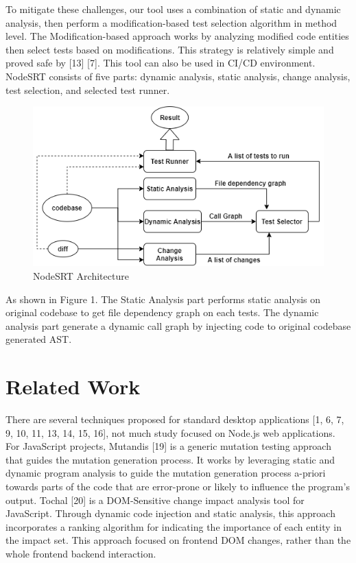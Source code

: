 \documentclass[10pt, conference]{IEEEtran}
\begin{document}
To mitigate these challenges, our tool uses a combination of static and dynamic analysis, then perform a modification-based test 
selection algorithm in method level. The Modification-based approach works by analyzing modified code entities 
then select tests based on modifications. This strategy is relatively simple and proved safe by [13] [7]. This tool can 
also be used in CI/CD environment. NodeSRT consists of five parts: dynamic analysis, static analysis, change analysis, 
test selection, and selected test runner. 
\begin{figure}[htbp]
    \centerline{\includegraphics[scale=0.45]{NodeSRT Architecture.png}}
    \caption{NodeSRT Architecture}
    \label{fig}
    \end{figure}    
    
As shown in Figure 1. The Static Analysis part performs static analysis on original codebase to get file dependency
graph on each tests. The dynamic analysis part generate a dynamic call graph by injecting code to original codebase 
generated AST. 

\section{Related Work}
There are several techniques proposed for standard desktop applications [1, 6, 7, 9, 10, 11, 13, 14, 15, 16], 
not much study focused on Node.js web applications. For JavaScript projects, Mutandis [19] is a generic mutation testing 
approach that guides the mutation generation process. It works by leveraging static and dynamic program 
analysis to guide the mutation generation process a-priori towards parts of the code that are error-prone or 
likely to influence the program’s output. 
Tochal [20] is a DOM-Sensitive change impact analysis tool for JavaScript. Through dynamic code injection and static analysis, this 
approach incorporates a ranking algorithm for indicating the importance of each entity in the impact set. This 
approach focused on frontend DOM changes, rather than the whole frontend backend interaction.
\end{document}
